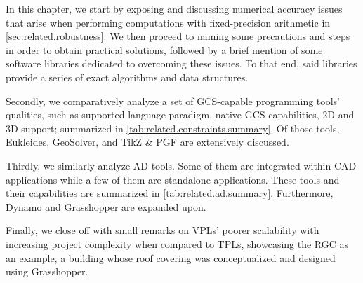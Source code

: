 %
\label{chap:related}
\cleardoublepage{}

\noindent
In this chapter, we start by exposing and discussing numerical accuracy issues
that arise when performing computations with fixed-precision arithmetic in
\cref{sec:related.robustness}.  We then proceed to naming some precautions and
steps in order to obtain practical solutions, followed by a brief mention of
some software libraries dedicated to overcoming these issues.  To that end, said
libraries provide a series of exact algorithms and data structures.

Secondly, we comparatively analyze a set of \ac{GCS}-capable programming tools'
qualities, such as supported language paradigm, native \ac{GCS} capabilities, 2D
and 3D support; summarized in \cref{tab:related.constraints.summary}.  Of those
tools, Eukleides, GeoSolver, and \acs{TikZ} \& \acs{PGF} are extensively
discussed.

Thirdly, we similarly analyze \ac{AD} tools.  Some of them are integrated within
\ac{CAD} applications while a few of them are standalone applications.  These
tools and their capabilities are summarized in \cref{tab:related.ad.summary}.
Furthermore, Dynamo and Grasshopper are expanded upon.

Finally, we close off with small remarks on \acp{VPL}' poorer scalability with
increasing project complexity when compared to \acp{TPL}, showcasing the
\ac{RGC} as an example, a building whose roof covering was conceptualized and
designed using Grasshopper.





